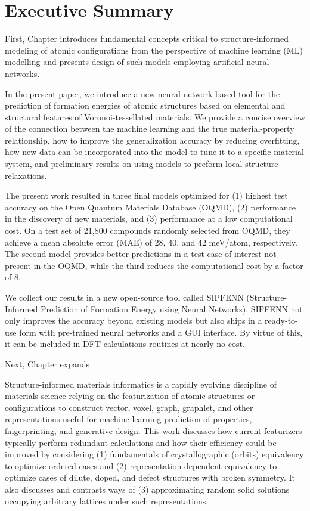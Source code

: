 \section{Executive Summary} \label{intro:sec:summary}

First, Chapter  introduces fundamental concepts critical to structure-informed modeling of atomic configurations from the perspective of machine learning (ML) modelling and presents design of such models employing artificial neural networks.

In the present paper, we introduce a new neural network-based tool for the prediction of formation energies of atomic structures based on elemental and structural features of Voronoi-tessellated materials. We provide a concise overview of the connection between the machine learning and the true material-property relationship, how to improve the generalization accuracy by reducing overfitting, how new data can be incorporated into the model to tune it to a specific material system, and preliminary results on using models to preform local structure relaxations.

The present work resulted in three final models optimized for (1) highest test accuracy on the Open Quantum Materials Database (OQMD), (2) performance in the discovery of new materials, and (3) performance at a low computational cost. On a test set of 21,800 compounds randomly selected from OQMD, they achieve a mean absolute error (MAE) of 28, 40, and 42 meV/atom, respectively. The second model provides better predictions in a test case of interest not present in the OQMD, while the third reduces the computational cost by a factor of 8.

We collect our results in a new open-source tool called SIPFENN (Structure-Informed Prediction of Formation Energy using Neural Networks). SIPFENN not only improves the accuracy beyond existing models but also ships in a ready-to-use form with pre-trained neural networks and a GUI  interface. By virtue of this, it can be included in DFT calculations routines at nearly no cost.

Next, Chapter  expands


Structure-informed materials informatics is a rapidly evolving discipline of materials science relying on the featurization of atomic structures or configurations to construct vector, voxel, graph, graphlet, and other representations useful for machine learning prediction of properties, fingerprinting, and generative design. This work discusses how current featurizers typically perform redundant calculations and how their efficiency could be improved by considering (1) fundamentals of crystallographic (orbits) equivalency to optimize ordered cases and (2) representation-dependent equivalency to optimize cases of dilute, doped, and defect structures with broken symmetry. It also discusses and contrasts ways of (3) approximating random solid solutions occupying arbitrary lattices under such representations.

